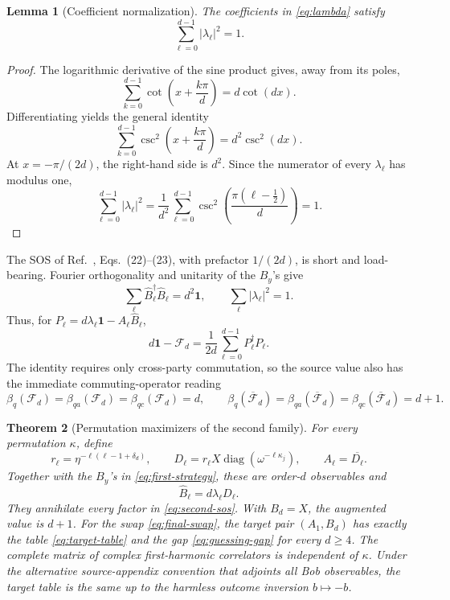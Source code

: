 \documentclass[11pt]{article}
\newtheorem{theorem}{Theorem}[section]
\newtheorem{lemma}[theorem]{Lemma}
\theoremstyle{definition}
\theoremstyle{remark}
\newcommand{\Id}{\mathbf 1}
\newcommand{\cF}{\mathcal F}
\newcommand{\absop}[1]{\lvert #1\rvert}
\begin{document}
\begin{lemma}[Coefficient normalization]
\label{lem:lambda-normalization}
The coefficients in \eqref{eq:lambda} satisfy
\[
 \sum_{\ell=0}^{d-1}\absop{\lambda_\ell}^2=1.
\]
\end{lemma}

\begin{proof}
The logarithmic derivative of the sine product gives, away from its poles,
\[
 \sum_{k=0}^{d-1}\cot\!\left(x+\frac{k\pi}{d}\right)
 =d\cot(dx).
\]
Differentiating yields the general identity
\begin{equation}
 \sum_{k=0}^{d-1}\csc^2\!\left(x+\frac{k\pi}{d}\right)
 =d^2\csc^2(dx).
 \label{eq:csc-square-sum}
\end{equation}
At \(x=-\pi/(2d)\), the right-hand side is \(d^2\).  Since the numerator
of every \(\lambda_\ell\) has modulus one,
\[
 \sum_{\ell=0}^{d-1}\absop{\lambda_\ell}^2
 =\frac1{d^2}\sum_{\ell=0}^{d-1}
 \csc^2\!\left(\frac{\pi(\ell-\tfrac12)}d\right)=1.
\]
\end{proof}

The SOS of Ref.~\cite{PeritoEtAl2026}, Eqs.~(22)--(23), with prefactor
\(1/(2d)\), is short and load-bearing.
Fourier orthogonality and unitarity of the \(B_y\)'s give
\[
 \sum_\ell \widehat B_\ell^\dagger\widehat B_\ell=d^2\Id,
 \qquad \sum_\ell\absop{\lambda_\ell}^2=1.
\]
Thus, for
\(P_\ell=d\lambda_\ell\Id-A_\ell\widehat B_\ell\),
\begin{equation}
 d\Id-\cF_d=\frac1{2d}\sum_{\ell=0}^{d-1}P_\ell^\dagger P_\ell.
 \label{eq:second-sos}
\end{equation}
The identity requires only cross-party commutation, so the source value also
has the immediate commuting-operator reading
\[
 \beta_q(\cF_d)=\beta_{qa}(\cF_d)=\beta_{qc}(\cF_d)=d,
 \qquad
 \beta_q(\overline{\cF}_d)=\beta_{qa}(\overline{\cF}_d)
 =\beta_{qc}(\overline{\cF}_d)=d+1.
\]

\begin{theorem}[Permutation maximizers of the second family]
\label{thm:second}
For every permutation \(\kappa\), define
\begin{equation}
 r_\ell=\eta^{-\ell(\ell-1+\delta_d)},
 \qquad
 D_\ell=r_\ell X\operatorname{diag}
 (\omega^{-\ell\kappa_j}),
 \qquad
 A_\ell=\overline{D_\ell}.
 \label{eq:second-A}
\end{equation}
Together with the \(B_y\)'s in \eqref{eq:first-strategy}, these are
order-\(d\) observables and
\begin{equation}
 \widehat B_\ell=d\lambda_\ell D_\ell.
 \label{eq:Fourier-compression}
\end{equation}
They annihilate every factor in \eqref{eq:second-sos}.  With \(B_d=X\), the
augmented value is \(d+1\).  For the swap \eqref{eq:final-swap}, the target
pair \((A_1,B_d)\) has exactly the table \eqref{eq:target-table} and the gap
\eqref{eq:guessing-gap} for every \(d\geq4\).  The complete matrix of complex
first-harmonic correlators is independent of \(\kappa\).  Under the
alternative source-appendix convention that adjoints all Bob observables,
the target table is the same up to the harmless outcome inversion
\(b\mapsto-b\).
\end{theorem}
\end{document}
